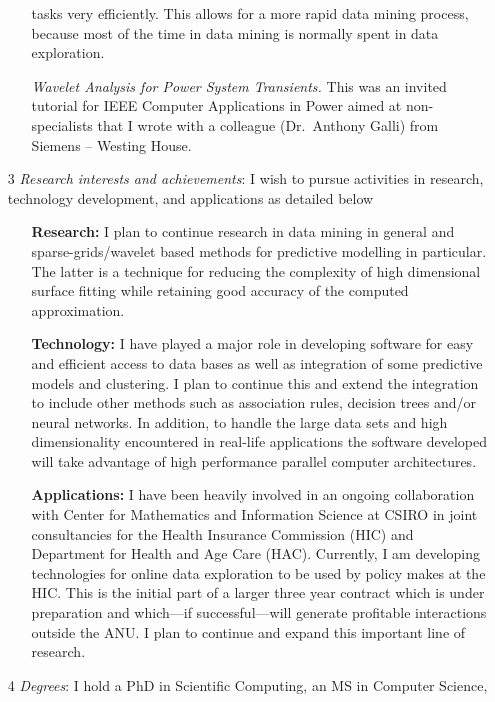 \documentclass[12pt,a4paper]{article}
\begin{document}
\begin{itemize}
\begin{itemize}
  tasks very efficiently. This allows for a more rapid data mining process, 
  because most of the time in data mining is normally spent in data 
  exploration.
  \item[] \textit{Wavelet Analysis for Power System Transients.}
  This was an invited tutorial for IEEE Computer Applications in Power
  aimed at non-specialists that I wrote with a 
  colleague (Dr.\ Anthony Galli) from Siemens -- Westing House.
  \end{itemize} \pagebreak
  \item[3] \textit{Research interests and achievements}:
  I wish to pursue activities in research, 
  technology development, and applications as detailed below\label{ref:PE}  
  \begin{itemize}
    \item[] \textbf{Research:} I plan to continue research in data mining
    in general and sparse-grids/wavelet based methods 
    for predictive modelling in particular. The latter is a technique 
    for reducing the complexity of high dimensional surface fitting
    while retaining good accuracy of the computed approximation.
    \item[] \textbf{Technology:} I have played a major role in developing
    software for easy and efficient access to data bases as well as
    integration of some predictive models and clustering. 
    I plan to continue this and extend the integration to include
    other methods such as association rules, decision trees and/or 
    neural networks. 
    In addition, to handle the large data sets and high dimensionality 
    encountered in real-life applications the software developed will
    take advantage of high performance parallel computer architectures.
    \item[] \textbf{Applications:}  
    I have been heavily involved in an ongoing collaboration 
    with Center for Mathematics and Information Science at CSIRO
    in joint consultancies for the Health Insurance Commission (HIC)
    and Department for Health and Age Care (HAC). 
    Currently, I am developing
    technologies for online data exploration to be used by policy makes 
    at the HIC. 
    This is the initial part of a larger three year contract
    which is under preparation and which---if successful---will generate
    profitable interactions outside the ANU.
    I plan to continue and expand this important line of research.
  \end{itemize}
  \item[4] \textit{Degrees}:  
  I hold a PhD in Scientific Computing, an MS in Computer Science,

\end{itemize}
\end{document}
